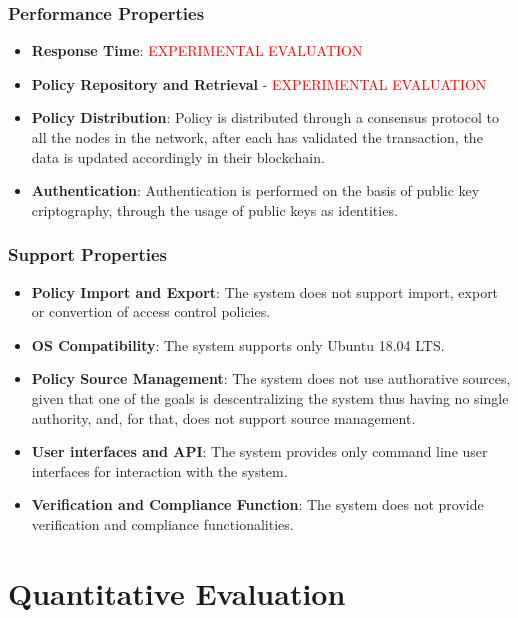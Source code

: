\subsubsection{Performance Properties}

\begin{itemize}
	\item \textbf{Response Time}: \textcolor{red}{EXPERIMENTAL EVALUATION}
	\item \textbf{Policy Repository and Retrieval} - \textcolor{red}{EXPERIMENTAL EVALUATION}
	\item \textbf{Policy Distribution}: Policy is distributed through a consensus protocol to all the nodes in the network, after each has validated the transaction, the data is updated accordingly in their blockchain.
	\item \textbf{Authentication}: Authentication is performed on the basis of public key criptography, through the usage of public keys as identities.
\end{itemize}

\subsubsection{Support Properties}

\begin{itemize}
    \item \textbf{Policy Import and Export}: The system does not support import, export or convertion of access control policies.
    \item \textbf{OS Compatibility}: The system supports only Ubuntu 18.04 LTS.
    \item \textbf{Policy Source Management}: The system does not use authorative sources, given that one of the goals is descentralizing the system thus having no single authority, and, for that, does not support source management.
    \item \textbf{User interfaces and API}: The system provides only command line user interfaces for interaction with the system.
    \item \textbf{Verification and Compliance Function}: The system does not provide verification and compliance functionalities.
\end{itemize}

\section{Quantitative Evaluation}



